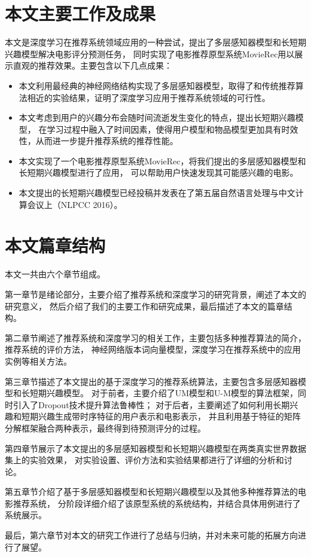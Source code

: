 \section{本文主要工作及成果}
本文是深度学习在推荐系统领域应用的一种尝试，提出了多层感知器模型和长短期兴趣模型解决电影评分预测任务，
同时实现了电影推荐原型系统MovieRec用以展示直观的推荐效果。主要包含以下几点成果：

\begin{itemize}
\item
本文利用最经典的神经网络结构实现了多层感知器模型，取得了和传统推荐算法相近的实验结果，证明了深度学习应用于推荐系统领域的可行性。
\item
本文考虑到用户的兴趣分布会随时间流逝发生变化的特点，提出长短期兴趣模型，
在学习过程中融入了时间因素，使得用户模型和物品模型更加具有时效性，从而进一步提升推荐系统的推荐性能。
\item
本文实现了一个电影推荐原型系统MovieRec，将我们提出的多层感知器模型和长短期兴趣模型进行了应用，
可以帮助用户快速发现其可能感兴趣的电影。
\item
本文提出的长短期兴趣模型已经投稿并发表在了第五届自然语言处理与中文计算会议上（NLPCC 2016）。
\end{itemize}

\section{本文篇章结构}
本文一共由六个章节组成。

第一章节是绪论部分，主要介绍了推荐系统和深度学习的研究背景，阐述了本文的研究意义，
然后介绍了我们的主要工作和研究成果，最后描述了本文的篇章结构。

第二章节阐述了推荐系统和深度学习的相关工作，主要包括多种推荐算法的简介，推荐系统的评价方法，
神经网络版本词向量模型，深度学习在推荐系统中的应用实例等相关方法。

第三章节描述了本文提出的基于深度学习的推荐系统算法，主要包含多层感知器模型和长短期兴趣模型。
对于前者，主要介绍了UM模型和U-M模型的算法框架，同时引入了Dropout技术提升算法鲁棒性；
对于后者，主要阐述了如何利用长期兴趣和短期兴趣生成带时序特征的用户表示和电影表示，
并且利用基于特征的矩阵分解框架融合两种表示，最终得到待预测评分的过程。

第四章节展示了本文提出的多层感知器模型和长短期兴趣模型在两类真实世界数据集上的实验效果，
对实验设置、评价方法和实验结果都进行了详细的分析和讨论。

第五章节介绍了基于多层感知器模型和长短期兴趣模型以及其他多种推荐算法的电影推荐系统，
分阶段详细介绍了该原型系统的系统结构，并结合具体用例进行了系统展示。

最后，第六章节对本文的研究工作进行了总结与归纳，并对未来可能的拓展方向进行了展望。



